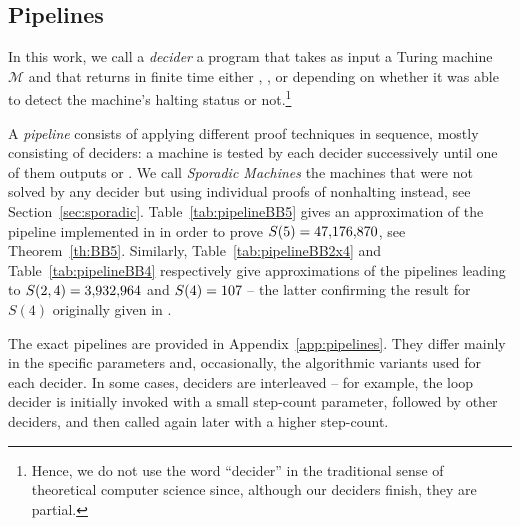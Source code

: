 
\subsection{Pipelines}\label{sec:pipelines}

In this work, we call a \textit{decider} a program that takes as input a Turing machine $\mathcal{M}$ and that returns in finite time either \HALT, \NONHALT, or \UNKNOWN depending on whether it was able to detect the machine's halting status or not.\footnote{Hence, we do not use the word ``decider'' in the traditional sense of theoretical computer science since, although our deciders finish, they are partial.}

A \textit{pipeline} consists of applying different proof techniques in sequence, mostly consisting of deciders: a machine is tested by each decider successively until one of them outputs \HALT or \NONHALT. We call \textit{Sporadic Machines} the \numSporadic machines that were not solved by any decider but using individual proofs of nonhalting instead, see Section~\ref{sec:sporadic}. Table~\ref{tab:pipelineBB5} gives an approximation of the pipeline implemented in \CoqBB in order to prove $S(5) = 47{,}176{,}870$, see Theorem~\ref{th:BB5}. Similarly, Table~\ref{tab:pipelineBB2x4} and Table~\ref{tab:pipelineBB4} respectively give approximations of the pipelines leading to $S(2,4) = 3{,}932{,}964$ and $S(4) = 107$ -- the latter confirming the result for $S(4)$ originally given in \cite{Brady83}.

The exact pipelines are provided in Appendix~\ref{app:pipelines}. They differ mainly in the specific parameters and, occasionally, the algorithmic variants used for each decider. In some cases, deciders are interleaved -- for example, the loop decider is initially invoked with a small step-count parameter, followed by other deciders, and then called again later with a higher step-count. %



